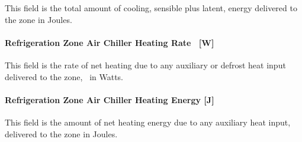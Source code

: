 This field is the total amount of cooling, sensible plus latent, energy delivered to the zone in Joules.

\paragraph{Refrigeration Zone Air Chiller Heating Rate~ {[}W{]}}\label{refrigeration-zone-air-chiller-heating-rate-w-1}

This field is the rate of net heating due to any auxiliary or defrost heat input delivered to the zone,~ in Watts.

\paragraph{Refrigeration Zone Air Chiller Heating Energy {[}J{]}}\label{refrigeration-zone-air-chiller-heating-energy-j}

This field is the amount of net heating energy due to any auxiliary heat input, delivered to the zone in Joules.